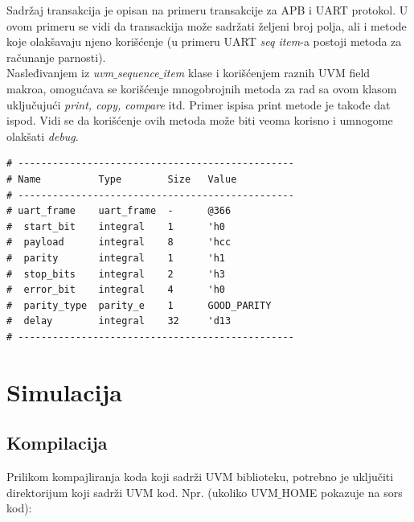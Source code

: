 Sadržaj transakcija je opisan na primeru transakcije za APB i UART protokol.
U ovom primeru se vidi da transackija može sadržati željeni broj polja, ali i
metode koje olakšavaju njeno korišćenje (u primeru UART \emph{seq item}-a
postoji metoda za računanje parnosti).\\





Nasleđivanjem iz \emph{uvm\(\_\)sequence\(\_\)item} klase i korišćenjem raznih
UVM field makroa, omogućava se korišćenje mnogobrojnih metoda za rad sa ovom
klasom uključujući \emph{print, copy, compare} itd.
Primer ispisa print metode je takođe dat ispod.
Vidi se da korišćenje ovih metoda može biti veoma korisno i umnogome olakšati \emph{debug}.\\

\begin{verbatim}
# ------------------------------------------------
# Name          Type        Size   Value
# ------------------------------------------------
# uart_frame    uart_frame  -      @366
#  start_bit    integral    1      'h0
#  payload      integral    8      'hcc
#  parity       integral    1      'h1
#  stop_bits    integral    2      'h3
#  error_bit    integral    4      'h0
#  parity_type  parity_e    1      GOOD_PARITY
#  delay        integral    32     'd13
# ------------------------------------------------
\end{verbatim}


\section{Simulacija}


\subsection{Kompilacija}

Prilikom kompajliranja koda koji sadrži UVM biblioteku, potrebno je uključiti
direktorijum koji sadrži UVM kod. Npr. (ukoliko UVM\(\_\)HOME pokazuje na sors
kod):

